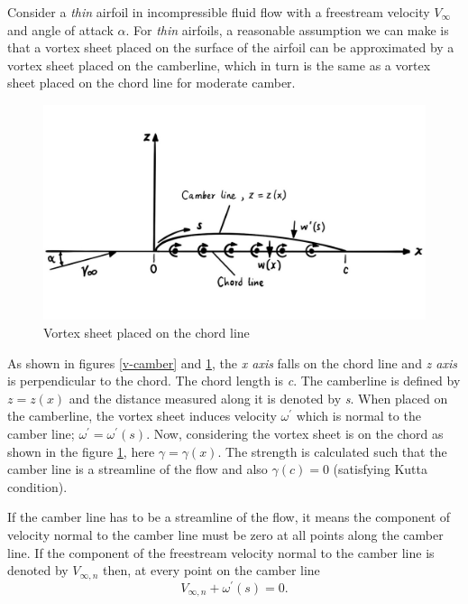 \documentclass[letterpaper,12pt]{article}
\begin{document}
Consider a \textit{thin} airfoil in incompressible fluid flow with a freestream velocity $V_\infty$ and angle of attack $\alpha$. For \textit{thin} airfoils, a reasonable assumption we can make is that a vortex sheet placed on the surface of the airfoil can be approximated by a vortex sheet placed on the camberline, which in turn is the same as a vortex sheet placed on the chord line for moderate camber.

\begin{figure}[H]
\includegraphics[scale=0.4]{1.2_vortexsheet_on_chord}
\centering
\caption{Vortex sheet placed on the chord line}
\label{v-chord}
\end{figure}

As shown in figures \ref{v-camber} and \ref{v-chord}, the \textit{x axis} falls on the chord line and \textit{z axis} is perpendicular to the chord. The chord length is \textit{c}. The camberline is defined by $z = z(x)$ and the distance measured along it is denoted by \textit{s}. When placed on the camberline, the vortex sheet induces velocity $\omega^{'}$ which is normal to the camber line; $\omega^{'} = \omega^{'}(s)$. Now, considering the vortex sheet is on the chord as shown in the figure \ref{v-chord}, here $\gamma = \gamma(x)$. The strength is calculated such that the camber line is a streamline of the flow and also $\gamma(c) = 0$ (satisfying Kutta condition).

If the camber line has to be a streamline of the flow, it means the component of velocity normal to the camber line must be zero at all points along the camber line. If the component of the freestream velocity normal to the camber line is denoted by $V_{\infty,n}$ then, at every point on the camber line 
\begin{equation}
V_{\infty,n} + \omega^{'}(s) = 0.
\label{v-norm}
\end{equation}
\end{document}
